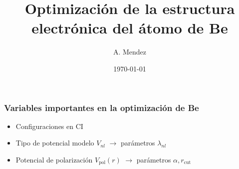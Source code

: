 \documentclass{beamer}
\title{Optimización de la estructura electrónica del átomo de Be}
\author{A. Mendez}
\date{\today} %
\begin{document}
\frame{\titlepage}
\begin{frame}
\end{frame}
\begin{frame}
\end{frame}
\begin{frame}
\frametitle{Variables importantes en la optimización de Be}
\begin{itemize}
\item Configuraciones en CI
\item Tipo de potencial modelo $V_{nl}$ 
      $\rightarrow$ parámetros $\lambda_{nl}$ 
\item Potencial de polarización $V_{\textrm{pol}}(r)$ 
      $\rightarrow$ parámetros $\alpha,r_{\mathrm{cut}}$ 
\end{itemize}
\end{frame}
\end{document}
